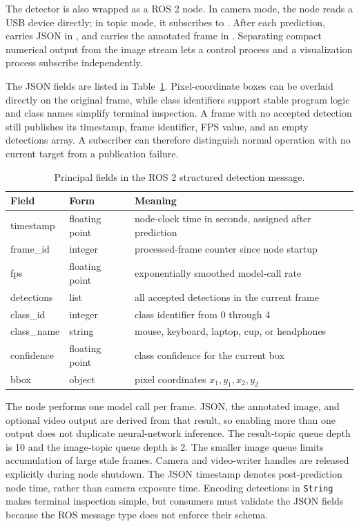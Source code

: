 \documentclass[12pt,a4paper]{article}
\begin{document}
The detector is also wrapped as a ROS 2 node. In camera mode, the node reads a USB device directly; in topic mode, it subscribes to . After each prediction,  carries JSON in , and  carries the annotated frame in . Separating compact numerical output from the image stream lets a control process and a visualization process subscribe independently\cite{ros2topics}.

The JSON fields are listed in Table~\ref{tab:rosfields}. Pixel-coordinate boxes can be overlaid directly on the original frame, while class identifiers support stable program logic and class names simplify terminal inspection. A frame with no accepted detection still publishes its timestamp, frame identifier, FPS value, and an empty detections array. A subscriber can therefore distinguish normal operation with no current target from a publication failure.

\begin{table}[htbp]
\caption{Principal fields in the ROS 2 structured detection message.}
\label{tab:rosfields}
\centering
\small
\begin{tabularx}{0.94\textwidth}{>{\ttfamily}p{}p{}>{\raggedright\arraybackslash}X}
\toprule
Field & Form & Meaning \\
\midrule
timestamp & floating point & node-clock time in seconds, assigned after prediction \\
frame\_id & integer & processed-frame counter since node startup \\
fps & floating point & exponentially smoothed model-call rate \\
detections & list & all accepted detections in the current frame \\
class\_id & integer & class identifier from 0 through 4 \\
class\_name & string & mouse, keyboard, laptop, cup, or headphones \\
confidence & floating point & class confidence for the current box \\
bbox & object & pixel coordinates $x_1,y_1,x_2,y_2$ \\
\bottomrule
\end{tabularx}
\end{table}

The node performs one model call per frame. JSON, the annotated image, and optional video output are derived from that result, so enabling more than one output does not duplicate neural-network inference. The result-topic queue depth is 10 and the image-topic queue depth is 2. The smaller image queue limits accumulation of large stale frames. Camera and video-writer handles are released explicitly during node shutdown. The JSON timestamp denotes post-prediction node time, rather than camera exposure time. Encoding detections in \texttt{String} makes terminal inspection simple, but consumers must validate the JSON fields because the ROS message type does not enforce their schema.
\end{document}
